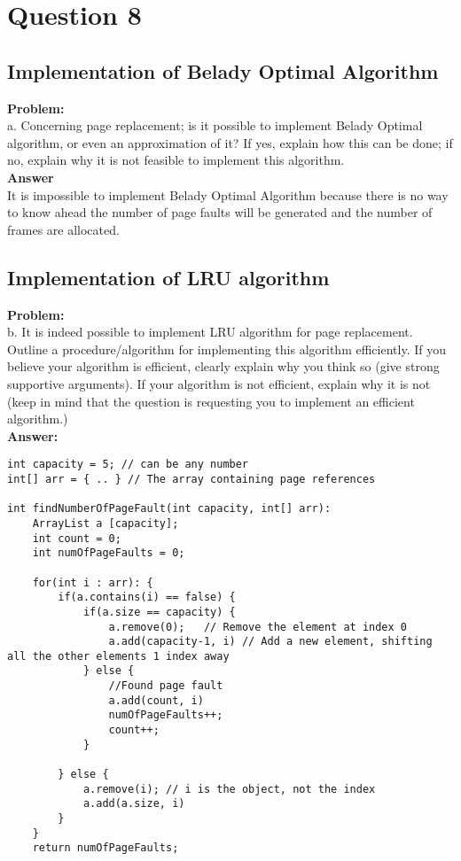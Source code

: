 \newpage
\section{Question 8}

\subsection{Implementation of Belady Optimal Algorithm}
\textbf{Problem:} \\
a. Concerning page replacement; is it possible to implement Belady Optimal algorithm, or
even an approximation of it? If yes, explain how this can be done; if no, explain why it is
not feasible to implement this algorithm. \\

\textbf{Answer} \\
It is impossible to implement Belady Optimal Algorithm because there is no way to know ahead the number of page faults will be generated and the number of frames are allocated.

\subsection{Implementation of LRU algorithm}
\textbf{Problem:} \\
b. It is indeed possible to implement LRU algorithm for page replacement. Outline a
procedure/algorithm for implementing this algorithm efficiently. If you believe your
algorithm is efficient, clearly explain why you think so (give strong supportive arguments).
If your algorithm is not efficient, explain why it is not (keep in mind that the question is
requesting you to implement an efficient algorithm.) \\

\textbf{Answer:} \\
\begin{lstlisting}
int capacity = 5; // can be any number
int[] arr = { .. } // The array containing page references

int findNumberOfPageFault(int capacity, int[] arr):
    ArrayList a [capacity];
    int count = 0;
    int numOfPageFaults = 0;

    for(int i : arr): {
        if(a.contains(i) == false) {
            if(a.size == capacity) {
                a.remove(0);   // Remove the element at index 0
                a.add(capacity-1, i) // Add a new element, shifting all the other elements 1 index away
            } else {
                //Found page fault
                a.add(count, i) 
                numOfPageFaults++;
                count++;
            }

        } else {
            a.remove(i); // i is the object, not the index
            a.add(a.size, i)
        }
    }
    return numOfPageFaults;
\end{lstlisting}

